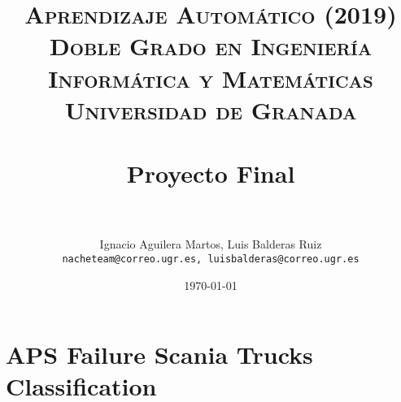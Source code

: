 
\graphicspath{ {./images/} }
\usepackage{subcaption}
\usepackage{hyperref}
\usepackage{soul}



\title{	
\normalfont \normalsize 
\textsc{\textbf{Aprendizaje Automático (2019)} \\ Doble Grado en Ingeniería Informática y Matemáticas \\ Universidad de Granada} \\ [25pt] %
\horrule{0.5pt} \\[0.4cm] %
\huge Proyecto Final \\ %
\horrule{2pt} \\[0.5cm] %
}

\author{Ignacio Aguilera Martos, Luis Balderas Ruiz \\ \texttt{nacheteam@correo.ugr.es, luisbalderas@correo.ugr.es}} 


\date{\normalsize\today} %




\maketitle %

\newpage %

\tableofcontents %

\listoffigures

\listoftables

\newpage



\section{APS Failure Scania Trucks Classification}

